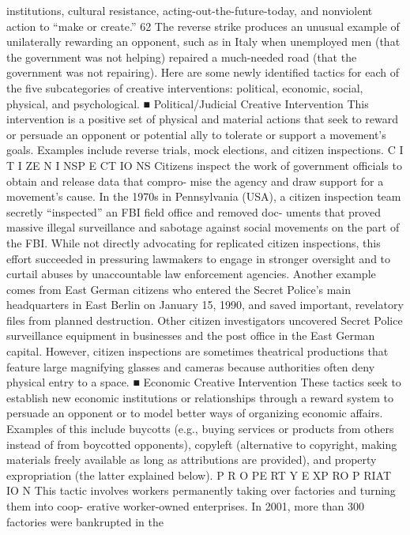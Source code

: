 \documentclass[twoside,a4paper,12pt,fleqn,openany]{extbook}
\begin{document}
institutions, cultural resistance, acting-out-the-future-today, and nonviolent action to “make
or create.”
62
The reverse strike produces an unusual example of unilaterally rewarding an opponent,
such as in Italy when unemployed men (that the government was not helping) repaired a
much-needed road (that the government was not repairing).
Here are some newly identified tactics for each of the five subcategories of creative
interventions: political, economic, social, physical, and psychological.
■ Political/Judicial Creative Intervention
This intervention is a positive set of physical and material actions that seek to reward or
persuade an opponent or potential ally to tolerate or support a movement’s goals. Examples
include reverse trials, mock elections, and citizen inspections.
C I T I ZE N I NSP E CT IO NS
Citizens inspect the work of government officials to obtain and release data that compro-
mise the agency and draw support for a movement’s cause. In the 1970s in Pennsylvania
(USA), a citizen inspection team secretly “inspected” an FBI field office and removed doc-
uments that proved massive illegal surveillance and sabotage against social movements
on the part of the FBI. While not directly advocating for replicated citizen inspections, this
effort succeeded in pressuring lawmakers to engage in stronger oversight and to curtail
abuses by unaccountable law enforcement agencies. Another example comes from East
German citizens who entered the Secret Police’s main headquarters in East Berlin on
January 15, 1990, and saved important, revelatory files from planned destruction. Other
citizen investigators uncovered Secret Police surveillance equipment in businesses and
the post office in the East German capital.
However, citizen inspections are sometimes theatrical productions that feature large
magnifying glasses and cameras because authorities often deny physical entry to a space.
■ Economic Creative Intervention
These tactics seek to establish new economic institutions or relationships through a reward
system to persuade an opponent or to model better ways of organizing economic affairs.
Examples of this include buycotts (e.g., buying services or products from others instead of from
boycotted opponents), copyleft (alternative to copyright, making materials freely available as
long as attributions are provided), and property expropriation (the latter explained below).
P R O PE RT Y E XP RO P RIAT IO N
This tactic involves workers permanently taking over factories and turning them into coop-
erative worker-owned enterprises. In 2001, more than 300 factories were bankrupted in the
\end{document}

